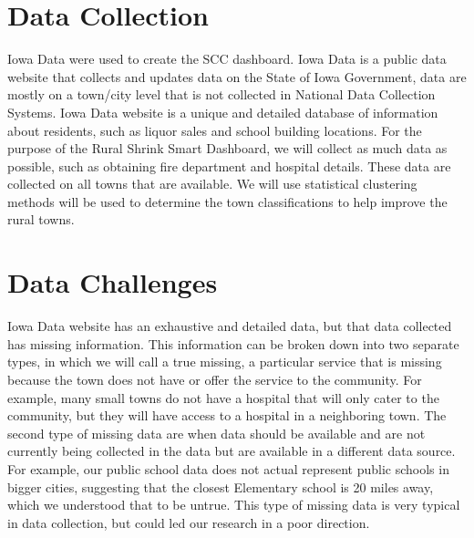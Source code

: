 \documentclass[10pt]{article}
\begin{document}
\section{Data Collection}
Iowa Data were used to create the SCC dashboard. Iowa Data is a public data website that collects and updates data on the State of Iowa Government, data are mostly on a town/city level that is not collected in National Data Collection Systems. Iowa Data website is a unique and detailed database of information about residents, such as liquor sales and school building locations. For the purpose of the Rural Shrink Smart Dashboard, we will collect as much data as possible, such as obtaining fire department and hospital details. These data are collected on all towns that are available. We will use statistical clustering methods will be used to determine the town classifications to help improve the rural towns.

\section{Data Challenges}
Iowa Data website has an exhaustive and detailed data, but that data collected has missing information. This information can be broken down into two separate types, in which we will call a true missing, a particular service that is missing because the town does not have or offer the service to the community. For example, many small towns do not have a hospital that will only cater to the community, but they will have access to a hospital in a neighboring town. The second type of missing data are when data should be available and are not currently being collected in the data but are available in a different data source. For example, our public school data does not actual represent public schools in bigger cities, suggesting that the closest Elementary school is 20 miles away, which we understood that to be untrue. This type of missing data is very typical in data collection, but could led our research in a poor direction.
\end{document}
